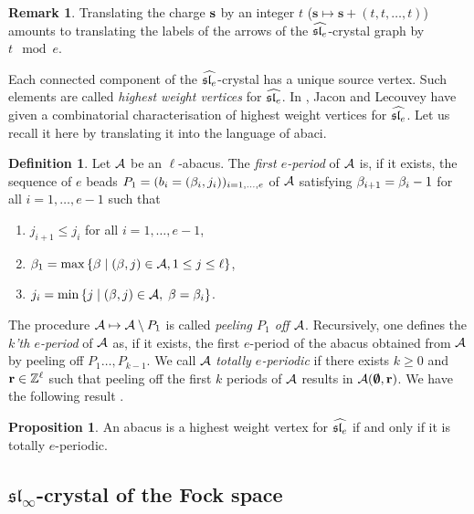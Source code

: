\documentclass[12pt]{amsart}
\numberwithin{equation}{section}
\theoremstyle{definition}
\newtheorem{proposition}[equation]{Proposition}
\newtheorem{definition}[equation]{Definition}
\newtheorem{remark}[equation]{Remark}
\newcommand{\slinf}{\mathfrak{sl}_\infty}
\newcommand{\mbs}{\mathbf{s}}
\begin{document}
\begin{remark}\label{remtranslationcharge1}
Translating the charge $\mathbf{s}$ by an integer $t$ ($\mbs\mapsto \mbs+(t,t,\dots,t)$) amounts to translating the 
labels of the arrows of the $\widehat{\mathfrak{sl}_e}$-crystal graph by $t\mod e$.
\end{remark}


Each connected component of the $\widehat{\mathfrak{sl}_e}$-crystal has a unique source vertex. Such elements are called \textit{highest weight vertices} for $\widehat{\mathfrak{sl}_e}$.
In \cite{JaconLecouvey2012}, Jacon and Lecouvey have given a
combinatorial characterisation of highest weight vertices for $\widehat{\mathfrak{sl}_e}$.
Let us recall it here by translating it into the language of abaci.

\begin{definition}\cite[Definition 2.2]{JaconLecouvey2012} \label{defperiodJL}
Let $\mathcal{A}$ be an $\ell$-abacus.
The \textit{first $e$-period} of $\mathcal{A}$ is, if it exists, the sequence of $e$ beads 
$P_1=(b_i=(\beta_i,j_i))_{i=1,\dots,e}$ of $\mathcal{A}$ satisfying $\beta_{i+1} = \beta_i-1$ for all $i=1,\dots,e-1$
such that 
\begin{enumerate} 
\item $j_{i+1} \leq j_i$ for all $i=1,\dots,e-1$,  
 \item $\beta_1 = \max \left\{ \beta \mid (\beta,j)\in\mathcal{A}, 1\leq j \leq \ell \right\}$,
\item $j_i = \min \left\{ j \mid (\beta,j) \in\mathcal{A}, \; \beta=\beta_i \right\}$.
\end{enumerate}
\end{definition}
The procedure $\mathcal{A} \mapsto \mathcal{A}\setminus P_1$ is called \textit{peeling $P_1$ off $\mathcal{A}$}.
Recursively, one defines the \textit{$k$'th $e$-period} of $\mathcal{A}$ as, if it exists,
the first $e$-period of the abacus obtained from $\mathcal{A}$ by peeling off $P_1 \dots, P_{k-1}$.
We call $\mathcal{A}$ \textit{totally $e$-periodic} if there exists $k\geq0$ and $\mathbf{r}\in\mathbb{Z}^\ell$ such that
peeling off the first $k$ periods of $\mathcal{A}$ results in $\mathcal{A}(\boldsymbol{\emptyset},\mathbf{r})$.
We have the following result \cite[Theorem 5.9]{JaconLecouvey2012}.
\begin{proposition} \label{hwvchapeau}
An abacus is a highest weight vertex for $\widehat{\mathfrak{sl}_e}$ if and only if it is totally $e$-periodic.
\end{proposition}







\subsection{$\slinf$-crystal of the Fock space}\label{Scrystal}
\end{document}
